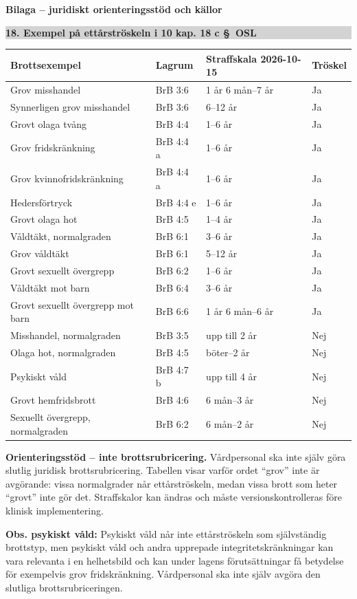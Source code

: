 \documentclass[10pt,a4paper]{article}
\newcommand{\sectionbar}[1]{%
  \par\smallskip\noindent
  \colorbox{lightgray}{\parbox{0.965\linewidth}{\bfseries #1}}%
  \par\smallskip
}
\begin{document}
\newpage

{\Large\bfseries Bilaga -- juridiskt orienteringsstöd och källor}

\sectionbar{18. Exempel på ettårströskeln i 10 kap. 18 c \S\ OSL}

\scriptsize
\begin{tabularx}{\linewidth}{p{43mm}p{26mm}p{35mm}X}
\textbf{Brottsexempel} & \textbf{Lagrum} & \textbf{Straffskala 2026-10-15} & \textbf{Tröskel}\\
\hline
Grov misshandel & BrB 3:6 & 1 år 6 mån--7 år & Ja\\
Synnerligen grov misshandel & BrB 3:6 & 6--12 år & Ja\\
Grovt olaga tvång & BrB 4:4 & 1--6 år & Ja\\
Grov fridskränkning & BrB 4:4 a & 1--6 år & Ja\\
Grov kvinnofridskränkning & BrB 4:4 a & 1--6 år & Ja\\
Hedersförtryck & BrB 4:4 e & 1--6 år & Ja\\
Grovt olaga hot & BrB 4:5 & 1--4 år & Ja\\
Våldtäkt, normalgraden & BrB 6:1 & 3--6 år & Ja\\
Grov våldtäkt & BrB 6:1 & 5--12 år & Ja\\
Grovt sexuellt övergrepp & BrB 6:2 & 1--6 år & Ja\\
Våldtäkt mot barn & BrB 6:4 & 3--6 år & Ja\\
Grovt sexuellt övergrepp mot barn & BrB 6:6 & 1 år 6 mån--6 år & Ja\\
\hline
Misshandel, normalgraden & BrB 3:5 & upp till 2 år & Nej\\
Olaga hot, normalgraden & BrB 4:5 & böter--2 år & Nej\\
Psykiskt våld & BrB 4:7 b & upp till 4 år & Nej\\
Grovt hemfridsbrott & BrB 4:6 & 6 mån--3 år & Nej\\
Sexuellt övergrepp, normalgraden & BrB 6:2 & 6 mån--2 år & Nej\\
\end{tabularx}
\footnotesize

\textbf{Orienteringsstöd -- inte brottsrubricering.} Vårdpersonal ska inte själv göra slutlig juridisk brottsrubricering. Tabellen visar varför ordet ``grov'' inte är avgörande: vissa normalgrader når ettårströskeln, medan vissa brott som heter ``grovt'' inte gör det. Straffskalor kan ändras och måste versionskontrolleras före klinisk implementering.

\textbf{Obs. psykiskt våld:} Psykiskt våld når inte ettårströskeln som självständig brottstyp, men psykiskt våld och andra upprepade integritetskränkningar kan vara relevanta i en helhetsbild och kan under lagens förutsättningar få betydelse för exempelvis grov fridskränkning. Vårdpersonal ska inte själv avgöra den slutliga brottsrubriceringen.
\end{document}
